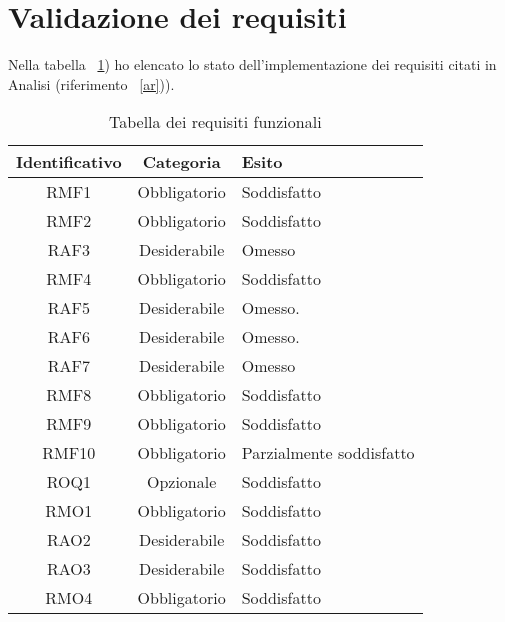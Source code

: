 \section{Validazione dei requisiti}
\label{val-req}

Nella tabella ~\ref{tab:validazione-requisiti}) ho elencato lo stato dell'implementazione dei requisiti citati in Analisi (riferimento ~\ref{ar})).

\begin{table}[H]
\caption{Tabella dei requisiti funzionali}
\label{tab:validazione-requisiti}
\begin{tabularx}{\linewidth}{|c|c|X|}
\hline
\textbf{Identificativo} & \textbf{Categoria} & \textbf{Esito} \\
\hline
RMF1 & Obbligatorio & Soddisfatto \\
\hline
RMF2 & Obbligatorio & Soddisfatto \\
\hline
RAF3 & Desiderabile & Omesso \\
\hline
RMF4 & Obbligatorio & Soddisfatto \\
\hline
RAF5 & Desiderabile & Omesso. \\
\hline
RAF6 & Desiderabile & Omesso. \\
\hline
RAF7 & Desiderabile & Omesso \\
\hline
RMF8 & Obbligatorio & Soddisfatto \\
\hline
RMF9 & Obbligatorio & Soddisfatto \\
\hline
RMF10 & Obbligatorio & Parzialmente soddisfatto \\
\hline
ROQ1 & Opzionale & Soddisfatto \\
\hline
RMO1 & Obbligatorio & Soddisfatto \\
\hline
RAO2 & Desiderabile & Soddisfatto \\
\hline
RAO3 & Desiderabile & Soddisfatto \\
\hline
RMO4 & Obbligatorio & Soddisfatto \\
\hline
\end{tabularx}
\end{table}

